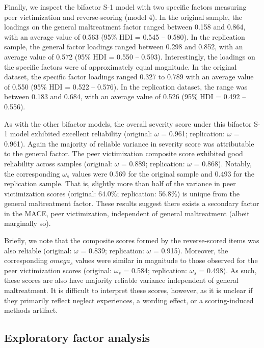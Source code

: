 \documentclass[letterpaper,man,natbib]{apa6}  %
\begin{document}
Finally, we inspect the bifactor S-1 model with two specific factors measuring peer victimization and reverse-scoring (model 4). In the original sample, the loadings on the general maltreatment factor ranged between 0.158 and 0.864, with an average value of 0.563 (95\% HDI = 0.545 -- 0.580). In the replication sample, the general factor loadings ranged between 0.298 and 0.852, with an average value of 0.572 (95\% HDI = 0.550 -- 0.593). Interestingly, the loadings on the specific factors were of approximately equal magnitude. In the original dataset, the specific factor loadings ranged 0.327 to 0.789 with an average value of 0.550 (95\% HDI = 0.522 -- 0.576). In the replication dataset, the range was between 0.183 and 0.684, with an average value of 0.526 (95\% HDI = 0.492 -- 0.556). 

As with the other bifactor models, the overall severity score under this bifactor S-1 model exhibited excellent reliability (original: $\omega$ = 0.961; replication: $\omega$ = 0.961). Again the majority of reliable variance in severity score was attributable to the general factor. The peer victimization composite score exhibited good reliability across samples (original: $\omega$ = 0.889; replication: $\omega$ = 0.868). Notably, the corresponding $\omega_s$ values were 0.569 for the original sample and 0.493 for the replication sample. That is, slightly more than half of the variance in peer victimization scores (original: 64.0\%; replication: 56.8\%) is unique from the general maltreatment factor. These results suggest there exists a secondary factor in the MACE, peer victimization, independent of general maltreatment (albeit marginally so). 

Briefly, we note that the composite scores formed by the reverse-scored items was also reliable (original: $\omega$ = 0.839; replication: $\omega$ = 0.915). Moreover, the corresponding $omega_s$ values were similar in magnitude to those observed for the peer victimization scores (original: $\omega_s$ = 0.584; replication: $\omega_s$ = 0.498). As such, these scores are also have majority reliable variance independent of general maltreatment. It is difficult to interpret these scores, however, as it is unclear if they primarily reflect neglect experiences, a wording effect, or a scoring-induced methods artifact. 

\subsection{Exploratory factor analysis}
\end{document}

